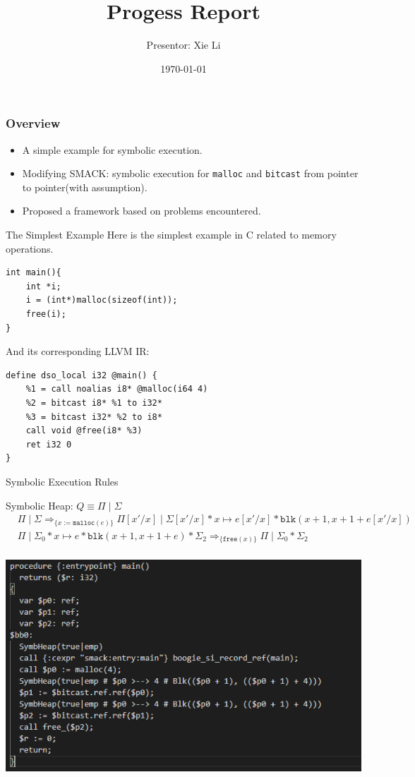 \documentclass[aspectratio=1610, 13pt]{beamer}
\title{Progess Report}
\date{\today}
\author{Presentor: Xie Li}
\begin{document}
\maketitle

\begin{frame}\frametitle{Overview}
\begin{itemize}
\item A simple example for symbolic execution.
\item Modifying SMACK: symbolic execution for \texttt{malloc} and \texttt{bitcast} from pointer to pointer(with assumption).
\item Proposed a framework based on problems encountered.
\end{itemize}
\end{frame}

\begin{frame}[fragile]{The Simplest Example}
    Here is the simplest example in C related to memory operations.
\begin{lstlisting}
int main(){
    int *i;
    i = (int*)malloc(sizeof(int));
    free(i);
}

\end{lstlisting}
And its corresponding LLVM IR:
\begin{lstlisting}
define dso_local i32 @main() {
    %1 = call noalias i8* @malloc(i64 4)
    %2 = bitcast i8* %1 to i32* 
    %3 = bitcast i32* %2 to i8*
    call void @free(i8* %3)
    ret i32 0
}

\end{lstlisting}

\end{frame}


\begin{frame}{Symbolic Execution Rules}
    
Symbolic Heap: $Q\equiv \Pi\mid \Sigma$
\begin{align*}
&\Pi\mid \Sigma\Rightarrow_{\{x:=\mathtt{malloc}(e)\}} \Pi[x'/x]\mid \Sigma[x'/x] * x\mapsto e[x'/x] * \mathtt{blk}(x+1,x+1+e[x'/x])\\
&\Pi\mid \Sigma_0 *x\mapsto e*\mathtt{blk}(x+1,x+1+e)*\Sigma_2\Rightarrow_{\{\texttt{free}(x)\}} \Pi \mid \Sigma_0 *\Sigma_2\\
\end{align*}
\begin{center}
    \includegraphics[scale=.65]{boogie.PNG}
\end{center}


\end{frame}
\end{document}
